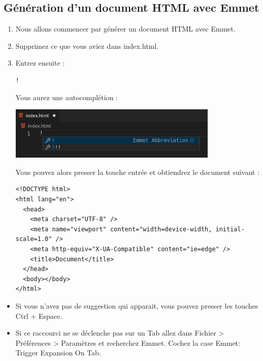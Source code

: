 \documentclass[a4paper]{article}
\begin{document}
\subsection{Génération d'un document {\color{monOrange}HTML} avec Emmet}
\begin{enumerate}
\item Nous allons commencer par générer un document {\color{monOrange}HTML} avec {\color{monOrange}Emmet}.

\item Supprimez ce que vous aviez dans index.html.

\item Entrez ensuite :
\begin{verbatim}
!
\end{verbatim}

Vous aurez une autocomplétion : 
\begin{center}
\includegraphics[width=10cm]{images/image05.png}
\end{center}

Vous pouvez alors presser la touche entrée et obtiendrez le document suivant :
\begin{verbatim}
<!DOCTYPE html>
<html lang="en">
  <head>
    <meta charset="UTF-8" />
    <meta name="viewport" content="width=device-width, initial-scale=1.0" />
    <meta http-equiv="X-UA-Compatible" content="ie=edge" />
    <title>Document</title>
  </head>
  <body></body>
</html>
\end{verbatim}


\end{enumerate}
\begin{itemize}
\item Si vous n'avez pas de suggestion qui apparait, vous pouvez presser les touches {\color{monOrange}Ctrl + Espace}.

\item Si ce raccourci ne se déclenche pas sur un Tab allez dans Fichier > Préférences > Paramètres et recherchez {\color{monOrange}Emmet}. Cochez la case {\color{monOrange}Emmet: Trigger Expansion On Tab}.

\end{itemize}
\end{document}
